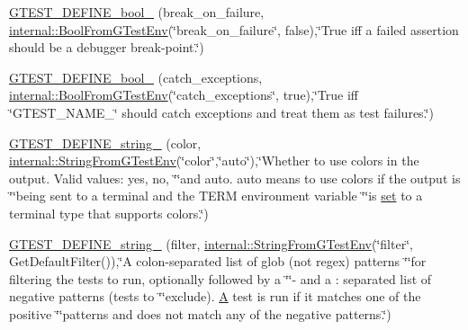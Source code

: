 \begin{DoxyCompactItemize}
\item 
\hyperlink{namespacetesting_a5c9316c2f726f836c50fcfc1065d718c}{G\+T\+E\+S\+T\+\_\+\+D\+E\+F\+I\+N\+E\+\_\+bool\+\_\+} (break\+\_\+on\+\_\+failure, \hyperlink{namespacetesting_1_1internal_a67132cdce23fb71b6c38ee34ef81eb4c}{internal\+::\+Bool\+From\+G\+Test\+Env}(\char`\"{}break\+\_\+on\+\_\+failure\char`\"{}, false),\char`\"{}True iff a failed assertion should be a debugger break-\/point.\char`\"{})
\item 
\hyperlink{namespacetesting_a16f63f28356f1843888013487da9f89d}{G\+T\+E\+S\+T\+\_\+\+D\+E\+F\+I\+N\+E\+\_\+bool\+\_\+} (catch\+\_\+exceptions, \hyperlink{namespacetesting_1_1internal_a67132cdce23fb71b6c38ee34ef81eb4c}{internal\+::\+Bool\+From\+G\+Test\+Env}(\char`\"{}catch\+\_\+exceptions\char`\"{}, true),\char`\"{}True iff \char`\"{}G\+T\+E\+S\+T\+\_\+\+N\+A\+M\+E\+\_\+\char`\"{} should catch exceptions and treat them as test failures.\char`\"{})
\item 
\hyperlink{namespacetesting_a00b4a4eabdef5927208aeabd81220069}{G\+T\+E\+S\+T\+\_\+\+D\+E\+F\+I\+N\+E\+\_\+string\+\_\+} (color, \hyperlink{namespacetesting_1_1internal_ac54dabc540bf79c2de91add679bfb93b}{internal\+::\+String\+From\+G\+Test\+Env}(\char`\"{}color\char`\"{},\char`\"{}auto\char`\"{}),\char`\"{}Whether to use colors in the output.  Valid values\+: yes, no, \char`\"{}\char`\"{}and auto.  \textquotesingle{}auto\textquotesingle{} means to use colors if the output is \char`\"{}\char`\"{}being sent to a terminal and the T\+E\+RM environment variable \char`\"{}\char`\"{}is \hyperlink{vendor_2googletest_2googlemock_2CMakeLists_8txt_aa99cc432a5064db15e7653de9d85d2d2}{set} to a terminal type that supports colors.\char`\"{})
\item 
\hyperlink{namespacetesting_aa7039e72c7b7041f11d2619c93a934d6}{G\+T\+E\+S\+T\+\_\+\+D\+E\+F\+I\+N\+E\+\_\+string\+\_\+} (filter, \hyperlink{namespacetesting_1_1internal_ac54dabc540bf79c2de91add679bfb93b}{internal\+::\+String\+From\+G\+Test\+Env}(\char`\"{}filter\char`\"{}, Get\+Default\+Filter()),\char`\"{}A colon-\/separated list of glob (not regex) patterns \char`\"{}\char`\"{}for filtering the tests to run, optionally followed by a \char`\"{}\char`\"{}\textquotesingle{}-\/\textquotesingle{} and a \+: separated list of negative patterns (tests to \char`\"{}\char`\"{}exclude).  \hyperlink{namespacetesting_a5e9134d655d2fc9323902348083282e7}{A} test is run if it matches one of the positive \char`\"{}\char`\"{}patterns and does not match any of the negative patterns.\char`\"{})
\item 

\end{DoxyCompactItemize}
